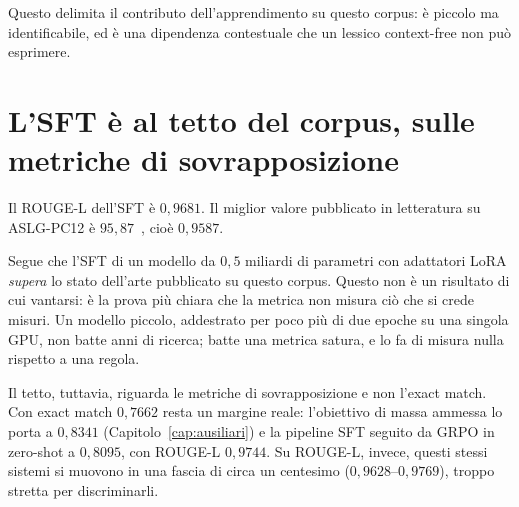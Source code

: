 Questo delimita il contributo dell'apprendimento su questo corpus: è piccolo ma
identificabile, ed è una dipendenza contestuale che un lessico context-free non
può esprimere.

\section{L'SFT è al tetto del corpus, sulle metriche di sovrapposizione}

Il ROUGE-L dell'SFT è $0{,}9681$. Il miglior valore pubblicato in letteratura su
ASLG-PC12 è $95{,}87$~\cite{peng2023monolingual}, cioè $0{,}9587$.

Segue che l'SFT di un modello da $0{,}5$ miliardi di parametri con adattatori
LoRA \emph{supera} lo stato dell'arte pubblicato su questo corpus. Questo non è
un risultato di cui vantarsi: è la prova più chiara che la metrica non misura
ciò che si crede misuri. Un modello piccolo, addestrato per poco più di due
epoche su una singola GPU, non batte anni di ricerca; batte una metrica satura, e lo fa di
misura nulla rispetto a una regola.

Il tetto, tuttavia, riguarda le metriche di sovrapposizione e non l'exact match.
Con exact match $0{,}7662$ resta un margine reale: l'obiettivo di massa ammessa
lo porta a $0{,}8341$ (Capitolo~\ref{cap:ausiliari}) e la pipeline SFT seguito
da GRPO in zero-shot a $0{,}8095$, con ROUGE-L $0{,}9744$. Su ROUGE-L, invece,
questi stessi sistemi si muovono in una fascia di circa un centesimo
($0{,}9628$--$0{,}9769$), troppo stretta per discriminarli.
